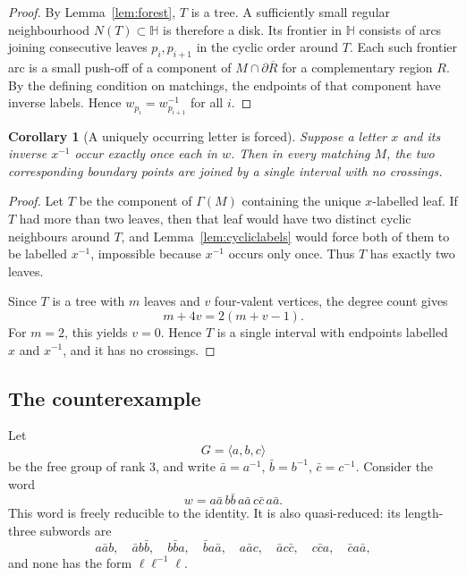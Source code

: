 \documentclass[12pt]{article}
\newtheorem{corollary}{Corollary}
\newcommand{\HH}{\mathbb H}
\newcommand{\bd}{\partial}
\begin{document}
\begin{proof}
By Lemma~\ref{lem:forest}, \(T\) is a tree.  A sufficiently small regular neighbourhood \(N(T)\subset \HH\) is therefore a disk.  Its frontier in \(\HH\) consists of arcs joining consecutive leaves \(p_i,p_{i+1}\) in the cyclic order around \(T\).  Each such frontier arc is a small push-off of a component of \(M\cap \bd\overline R\) for a complementary region \(R\).  By the defining condition on matchings, the endpoints of that component have inverse labels.  Hence \(w_{p_i}=w_{p_{i+1}}^{-1}\) for all \(i\).
\end{proof}

\begin{corollary}[A uniquely occurring letter is forced]\label{cor:forced}
Suppose a letter \(x\) and its inverse \(x^{-1}\) occur exactly once each in \(w\).  Then in every matching \(M\), the two corresponding boundary points are joined by a single interval with no crossings.
\end{corollary}

\begin{proof}
Let \(T\) be the component of \(\Gamma(M)\) containing the unique \(x\)-labelled leaf.  If \(T\) had more than two leaves, then that leaf would have two distinct cyclic neighbours around \(T\), and Lemma~\ref{lem:cycliclabels} would force both of them to be labelled \(x^{-1}\), impossible because \(x^{-1}\) occurs only once.  Thus \(T\) has exactly two leaves.

Since \(T\) is a tree with \(m\) leaves and \(v\) four-valent vertices, the degree count gives
\[
m+4v=2(m+v-1).
\]
For \(m=2\), this yields \(v=0\).  Hence \(T\) is a single interval with endpoints labelled \(x\) and \(x^{-1}\), and it has no crossings.
\end{proof}

\subsection{The counterexample}

Let
\[
G=\langle a,b,c\rangle
\]
be the free group of rank \(3\), and write \(\bar a=a^{-1}\), \(\bar b=b^{-1}\), \(\bar c=c^{-1}\).  Consider the word
\[
w=a\bar a\, b\bar b\, a\bar a\, c\bar c\, a\bar a.
\]
This word is freely reducible to the identity.  It is also quasi-reduced: its length-three subwords are
\[
a\bar a b,\quad
\bar a b\bar b,\quad
b\bar b a,\quad
\bar b a\bar a,\quad
a\bar a c,\quad
\bar a c\bar c,\quad
c\bar c a,\quad
\bar c a\bar a,
\]
and none has the form \(\ell\ell^{-1}\ell\).
\end{document}
